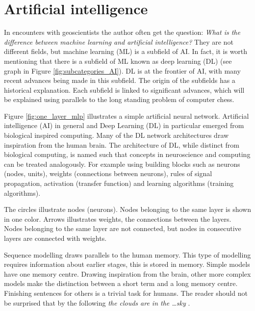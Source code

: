 \documentclass{article}
\begin{document}
\section{Artificial intelligence}

In encounters with geoscientists the author often get the question: \textit{What is the difference between machine learning and artificial intelligence?} They are not different fields, but machine learning (ML) is a subfield of AI. In fact, it is worth mentioning that there is a subfield of ML known as deep learning (DL) (see graph in Figure \ref{fig:subcategories_AI}). DL is at the frontier of AI, with many recent advances being made in this subfield. %
The origin of the subfields has a historical explanation. Each subfield is linked to significant advances, which will be explained using parallels to the long standing problem of computer chess. 

Figure \ref{fig:one_layer_mlp} illustrates a simple artificial neural network. Artificial intelligence (AI) in general and Deep Learning (DL) in particular emerged from biological inspired computing. Many of the DL network architectures draw inspiration from the human brain. The architecture of DL, while distinct from biological computing, is named such that concepts in neuroscience and computing can be treated analogously. For example using building blocks such as neurons (nodes, units), weights (connections between neurons), rules of signal propagation, activation (transfer function) and learning algorithms (training algorithms). %

The circles illustrate nodes (neurons). Nodes belonging to the same layer is shown in one color. Arrows illustrates weights, the connections between the layers. Nodes belonging to the same layer are not connected, but nodes in consecutive layers are connected with weights. 

Sequence modelling draws parallels to the human memory. This type of modelling requires information about earlier stages, this is stored in memory. 
Simple models have one memory centre. Drawing inspiration from the brain, other more complex models make the distinction between a short term and a long memory centre. Finishing sentences for others is a trivial task for humans. The reader should not be surprised that by the following \textit{the clouds are in the \ldots sky} \cite{colah_blog_post}.
\end{document}
